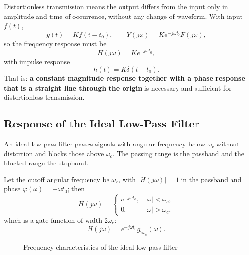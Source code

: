 Distortionless transmission means the output differs from the input only in
amplitude and time of occurrence, without any change of waveform. With input
$f(t)$,
\[
    y(t)=Kf(t-t_0),
    \qquad
    Y(j\omega)=Ke^{-j\omega t_0}F(j\omega),
\]
so the frequency response must be
\[
    H(j\omega)=Ke^{-j\omega t_0},
\]
with impulse response
\[
    h(t)=K\delta(t-t_0).
\]
That is: \textbf{a constant magnitude response together with a phase response
that is a straight line through the origin} is necessary and sufficient for
distortionless transmission.

\subsection{Response of the Ideal Low-Pass Filter}

An ideal low-pass filter passes signals with angular frequency below
$\omega_c$ without distortion and blocks those above $\omega_c$. The passing
range is the passband and the blocked range the stopband.

Let the cutoff angular frequency be $\omega_c$, with
$|H(j\omega)|=1$ in the passband and phase $\varphi(\omega)=-\omega t_0$;
then
\[
    H(j\omega)=
    \begin{cases}
        e^{-j\omega t_0}, & |\omega|<\omega_c,\\
        0, & |\omega|>\omega_c,
    \end{cases}
\]
which is a gate function of width $2\omega_c$:
\[
    H(j\omega)=e^{-j\omega t_0}g_{2\omega_c}(\omega).
\]

\begin{figure}[htbp]
\centering
{}
\hspace{6mm}
\caption{Frequency characteristics of the ideal low-pass filter}
\end{figure}

